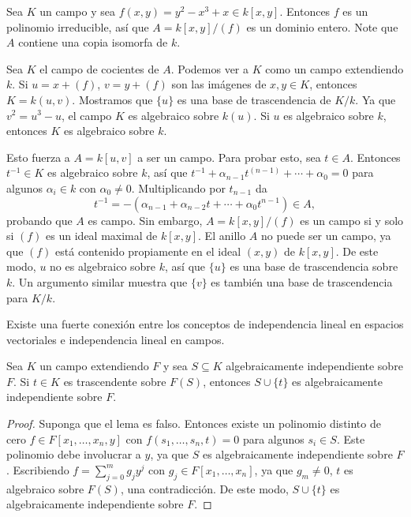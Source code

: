 \begin{example}
  Sea $K$ un campo y sea $f(x,y) = y^2 - x^3 + x \in k[x,y]$. Entonces $f$ es un polinomio irreducible, así que $A = k[x,y]/(f)$ es un dominio entero. Note que $A$ contiene una copia isomorfa de $k$.

  Sea $K$ el campo de cocientes de $A$. Podemos ver a $K$ como un campo extendiendo $k$. Si $u = x + (f)$, $v = y + (f)$ son las imágenes de $x,y \in K$, entonces $K = k(u,v)$. Mostramos que $\{u\}$ es una base de trascendencia de $K/k$. Ya que $v^2 = u^3 - u$, el campo $K$ es algebraico sobre $k(u)$. Si $u$ es algebraico sobre $k$, entonces $K$ es algebraico sobre $k$.

  Esto fuerza a $A = k[u,v]$ a ser un campo. Para probar esto, sea $t \in A$. Entonces $t^{-1} \in K$ es algebraico sobre $k$, así que $t^{-1} + \alpha_{n-1}t^{(n-1)} + \cdots + \alpha_0 = 0$ para algunos $\alpha_i \in k$ con $\alpha_0 \neq 0$. Multiplicando por $t_{n-1}$ da
  \[
    t^{-1} = -(\alpha_{n-1} + \alpha_{n-2}t + \cdots + \alpha_0 t^{n-1})\in A,
  \]
  probando que $A$ es campo. Sin embargo, $A = k[x,y]/(f)$ es un campo si y solo si $(f)$ es un ideal maximal de $k[x,y]$. El anillo $A$ no puede ser un campo, ya que $(f)$ está contenido propiamente en el ideal $(x,y)$ de $k[x,y]$. De este modo, $u$ no es algebraico sobre $k$, así que $\{u\}$ es una base de trascendencia sobre $k$. Un argumento similar muestra que $\{v\}$ es también una base de trascendencia para $K/k$.
\end{example}

Existe una fuerte conexión entre los conceptos de independencia lineal en espacios vectoriales e independencia lineal en campos.

\begin{lemma}\label{lemma:2.1.12}%
  Sea $K$ un campo extendiendo $F$ y sea $S \subseteq K$ algebraicamente independiente sobre $F$. Si $t\in K$ es trascendente sobre $F(S)$, entonces $S \cup \{t\}$ es algebraicamente independiente sobre $F$.
\end{lemma}
\begin{proof}
  Suponga que el lema es falso. Entonces existe un polinomio distinto de cero $f \in F[x_1, \ldots, x_n, y]$ con $f(s_1, \ldots, s_n, t) = 0$ para algunos $s_i \in S$. Este polinomio debe involucrar a $y$, ya que $S$ es algebraicamente independiente sobre $F$. Escribiendo $f = \sum_{j=0}^m g_j y^j$ con $g_j \in F[x_1, \ldots, x_n]$, ya que $g_m \neq 0 $, $t$ es algebraico sobre $F(S)$, una contradicción. De este modo, $S \cup \{t\}$ es algebraicamente independiente sobre $F$.
\end{proof}

